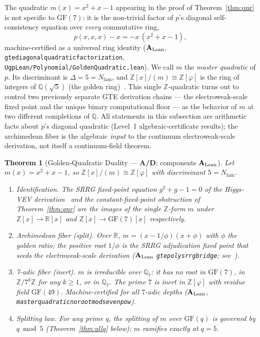 \documentclass[11pt]{article}
\newtheorem{theorem}{Theorem}[section]
\theoremstyle{remark}
\newcommand{\GF}[1]{\ensuremath{\mathrm{GF}(#1)}}
\newcommand{\lean}[1]{%
  \penalty-100
  \begingroup\def\_{\textunderscore\allowbreak}\texttt{#1}\endgroup}
\newcommand{\CatAL}{\texorpdfstring{\ensuremath{\textbf{A}_{\rm Lean}}}{A-Lean}}
\newcommand{\CatAD}{\textbf{A/D}}
\begin{document}
The quadratic $m(x) = x^2 + x - 1$ appearing in the proof of
Theorem~\ref{thm:qnr} is not specific to $\GF{7}$: it is the non-trivial
factor of $p$'s diagonal self-consistency equation over \emph{every}
commutative ring,
\begin{equation}
  p(x,x,x) - x = -x\,(x^2 + x - 1),
  \label{eq:diag-factorization}
\end{equation}
machine-certified as a universal ring identity (\CatAL{},
\lean{gte\_diagonal\_quadratic\_factorization},
\lean{UgpLean/Polynomial/GoldenQuadratic.lean}). We call $m$ the
\emph{master quadratic} of $p$. Its discriminant is
$\Delta = 5 = N_{\mathrm{fam}}$, and $\mathbb{Z}[x]/(m) \cong
\mathbb{Z}[\varphi]$ is the ring of integers of $\mathbb{Q}(\sqrt{5})$
(the golden ring)~\cite{IrelandRosen1990}. This single $\mathbb{Z}$-quadratic
turns out to control two previously separate GTE derivation chains --- the
electroweak-scale fixed point and the unique binary computational floor ---
as the behavior of $m$ at two different completions of $\mathbb{Q}$. All
statements in this subsection are arithmetic facts about $p$'s diagonal
quadratic (Level~1 algebraic-certificate results); the archimedean fiber is
the algebraic \emph{input} to the continuum electroweak-scale derivation, not
itself a continuum-field theorem.

\begin{theorem}[Golden-Quadratic Duality --- \CatAD{}; components \CatAL{}]
\label{thm:duality}
Let $m(x) = x^2 + x - 1$, so $\mathbb{Z}[x]/(m) \cong \mathbb{Z}[\varphi]$
with discriminant $5 = N_{\mathrm{fam}}$.
\begin{enumerate}[leftmargin=2em,itemsep=2pt,topsep=2pt,label=(\alph*)]
  \item \emph{Identification.} The SRRG fixed-point equation
    $g^2 + g - 1 = 0$ of the Higgs-VEV derivation~\cite{SpivackSRRG,
    SpivackPolynomialTransputation} and the constant-fixed-point obstruction
    of Theorem~\ref{thm:qnr} are the images of the single $\mathbb{Z}$-form
    $m$ under $\mathbb{Z}[x] \to \mathbb{R}[x]$ and
    $\mathbb{Z}[x] \to \GF{7}[x]$ respectively.
  \item \emph{Archimedean fiber (split).} Over $\mathbb{R}$,
    $m = (x - 1/\phi)(x + \phi)$ with $\phi$ the golden ratio; the positive
    root $1/\phi$ is the SRRG adjudication fixed point that seeds the
    electroweak-scale derivation (\CatAL{} \lean{gte\_poly\_srrg\_bridge};
    see~\cite{SpivackSRRG}).
  \item \emph{7-adic fiber (inert).} $m$ is irreducible over
    $\mathbb{Q}_7$: it has no root in $\GF{7}$, in
    $\mathbb{Z}/7^k\mathbb{Z}$ for any $k \geq 1$, or in $\mathbb{Q}_7$.
    The prime $7$ is inert in $\mathbb{Z}[\varphi]$ with residue field
    $\GF{49}$. Machine-certified for all $7$-adic depths (\CatAL{},
    \lean{master\_quadratic\_no\_root\_mod\_seven\_pow}).
  \item \emph{Splitting law.} For any prime $q$, the splitting of $m$ over
    $\GF{q}$ is governed by $q \bmod 5$ (Theorem~\ref{thm:allq} below);
    $m$ ramifies exactly at $q = 5$.
\end{enumerate}
\end{theorem}
\end{document}
